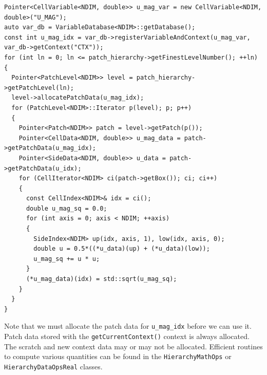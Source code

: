 \documentclass{article}
\begin{document}
\begin{verbatim}
Pointer<CellVariable<NDIM, double>> u_mag_var = new CellVariable<NDIM, double>("U_MAG");
auto var_db = VariableDatabase<NDIM>::getDatabase();
const int u_mag_idx = var_db->registerVariableAndContext(u_mag_var, var_db->getContext("CTX"));
for (int ln = 0; ln <= patch_hierarchy->getFinestLevelNumber(); ++ln)
{
  Pointer<PatchLevel<NDIM>> level = patch_hierarchy->getPatchLevel(ln);
  level->allocatePatchData(u_mag_idx);
  for (PatchLevel<NDIM>::Iterator p(level); p; p++)
  {
    Pointer<Patch<NDIM>> patch = level->getPatch(p());
    Pointer<CellData<NDIM, double>> u_mag_data = patch->getPatchData(u_mag_idx);
    Pointer<SideData<NDIM, double>> u_data = patch->getPatchData(u_idx);
    for (CellIterator<NDIM> ci(patch->getBox()); ci; ci++)
    {
      const CellIndex<NDIM>& idx = ci();
      double u_mag_sq = 0.0;
      for (int axis = 0; axis < NDIM; ++axis)
      {
        SideIndex<NDIM> up(idx, axis, 1), low(idx, axis, 0);
        double u = 0.5*((*u_data)(up) + (*u_data)(low));
        u_mag_sq += u * u;
      }
      (*u_mag_data)(idx) = std::sqrt(u_mag_sq);
    }
  }
}
\end{verbatim}
Note that we must allocate the patch data for \verb|u_mag_idx| before we can use it. Patch data stored with the \verb|getCurrentContext()| context is always allocated. The scratch and new context data may or may not be allocated. Efficient routines to compute various quantities can be found in the \verb|HierarchyMathOps| or \verb|HierarchyDataOpsReal| classes.
\end{document}
